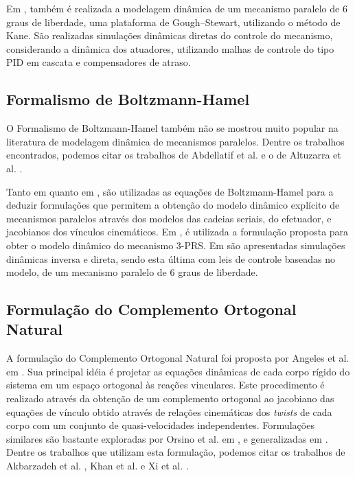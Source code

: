 \documentclass[]{politex}
\begin{document}
Em \cite{Shukla}, também é realizada a modelagem dinâmica de um mecanismo paralelo de 6 graus de liberdade, uma plataforma de Gough–Stewart, utilizando o método de Kane. São realizadas simulações dinâmicas diretas do controle do mecanismo, considerando a dinâmica dos atuadores, utilizando malhas de controle do tipo PID em cascata e compensadores de atraso.

\subsection{Formalismo de Boltzmann-Hamel}

O Formalismo de Boltzmann-Hamel \cite{Jarzebowska} também não se mostrou muito popular na literatura de modelagem dinâmica de mecanismos paralelos. Dentre os trabalhos encontrados, podemos citar os trabalhos de Abdellatif et al. \cite{Abdellatif2} e o de Altuzarra et al. \cite{20altuzarra}.

Tanto em \cite{Abdellatif2} quanto em \cite{20altuzarra}, são utilizadas as equações de Boltzmann-Hamel para a deduzir formulações que permitem a obtenção do modelo dinâmico explícito de mecanismos paralelos através dos modelos das cadeias seriais, do efetuador, e jacobianos dos vínculos cinemáticos. Em \cite{20altuzarra}, é utilizada a formulação proposta para obter o modelo dinâmico do mecanismo 3-PRS. Em \cite{Abdellatif2} são apresentadas simulações dinâmicas inversa e direta, sendo esta última com leis de controle baseadas no modelo, de um mecanismo paralelo de 6 graus de liberdade.


\subsection{Formulação do Complemento Ortogonal Natural}

A formulação do Complemento Ortogonal Natural foi proposta por Angeles et al. em \cite{Angeles}. Sua principal idéia é projetar as equações dinâmicas de cada corpo rígido do sistema em um espaço ortogonal às reações vinculares. Este procedimento é realizado através da obtenção de um complemento ortogonal ao jacobiano das equações de vínculo obtido através de relações cinemáticas dos \emph{twists} de cada corpo com um conjunto de quasi-velocidades independentes. Formulações similares são bastante exploradas por Orsino et al. em \cite{22orsino}, e generalizadas em \cite{23orsino}. Dentre os trabalhos que utilizam esta formulação, podemos citar os trabalhos de Akbarzadeh et al. \cite{Akbarzadeh}, Khan et al. \cite{Khan} e Xi et al. \cite{Xi}.
\end{document}
